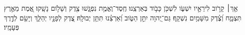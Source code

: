 \documentclass{openreader}
\begin{document}
אַ֤ךְ׀ קָרֹ֣וב לִירֵאָ֣יו יִשְׁעֹ֑ו לִשְׁכֹּ֖ן כָּבֹ֣וד בְּאַרְצֵֽנוּ׃ 
חֶֽסֶד־וֶאֱמֶ֥ת נִפְגָּ֑שׁוּ צֶ֖דֶק וְשָׁלֹ֣ום נָשָֽׁקוּ׃ 
אֱ֭מֶת מֵאֶ֣רֶץ תִּצְמָ֑ח וְ֝צֶ֗דֶק מִשָּׁמַ֥יִם נִשְׁקָֽף׃ 
גַּם־יְ֭הוָה יִתֵּ֣ן הַטֹּ֑וב וְ֝אַרְצֵ֗נוּ תִּתֵּ֥ן יְבוּלָֽהּ׃ 
צֶ֭דֶק לְפָנָ֣יו יְהַלֵּ֑ךְ וְיָשֵׂ֖ם לְדֶ֣רֶךְ פְּעָמָֽיו׃ 
\end{document}

